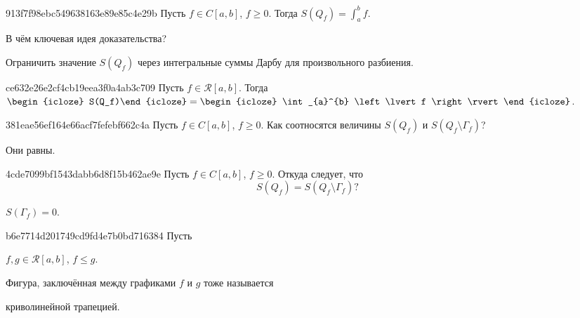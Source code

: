 \begin{note}{913f7f98ebc549638163e89e85c4e29b}
    Пусть \({ f \in C[a, b] }\),\: \({ f \geqslant 0 }\).
    Тогда \({ S(Q_f) = \int_{a}^{b} f }\).

    В чём ключевая идея доказательства?

    \begin{cloze}{1}
        Ограничить значение \({ S(Q_f) }\) через интегральные суммы Дарбу для произвольного разбиения.
    \end{cloze}
\end{note}

\begin{note}{ce632e26e2cf4cb19eea3f0a4ab3c709}
    Пусть \({ f \in \mathcal R[a, b] }\).
    Тогда \({ \begin{icloze}{2}S(Q_f)\end{icloze} = \begin{icloze}{1}\int_{a}^{b} \left\lvert f \right\rvert\end{icloze} }\).
\end{note}

\begin{note}{381eae56ef164e66acf7fefebf662c4a}
    Пусть \({ f \in C[a, b] }\),\: \({ f \geqslant 0 }\).
    Как соотносятся величины \({ S(Q_f) }\) и \({ S(Q_f \setminus \Gamma_f) }\)?

    \begin{cloze}{1}
        Они равны.
    \end{cloze}
\end{note}

\begin{note}{4cde7099bf1543dabb6d8f15b462ae9e}
    Пусть \({ f \in C[a, b] }\),\: \({ f \geqslant 0 }\).
    Откуда следует, что
    \[
        S(Q_f) = S(Q_f \setminus \Gamma_f)?
    \]

    \begin{cloze}{1}
        \({ S(\Gamma_f) = 0 }\).
    \end{cloze}
\end{note}

\begin{note}{b6e7714d201749cd9fd4e7b0bd716384}
    Пусть \begin{icloze}{2}\({ f, g \in \mathcal R[a, b] }\),\: \({ f \leqslant g }\).\end{icloze}
    Фигура, заключённая между графиками \({ f }\) и \({ g }\) тоже называется \begin{icloze}{1}криволинейной трапецией.\end{icloze}
\end{note}

